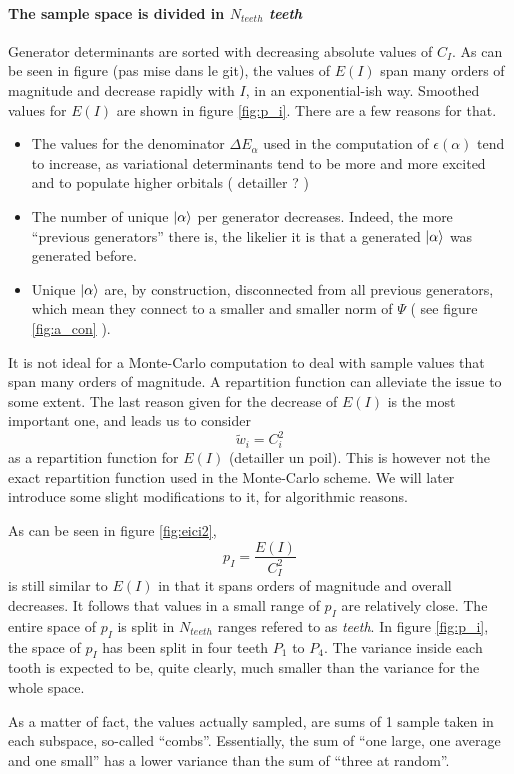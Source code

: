 \documentclass[./thesis.tex]{subfiles}
\begin{document}
\paragraph{The sample space is divided in $N_{teeth}$ \emph{teeth}}
	Generator determinants are sorted with decreasing absolute values of $C_I$.
	As can be seen in figure (pas mise dans le git), the values of $E(I)$ span many orders of magnitude and decrease rapidly with $I$, in an exponential-ish way. Smoothed values for $E(I)$ are shown in figure \ref{fig:p_i}. There are a few reasons for that.
\begin{itemize}
	\item
	The values for the denominator $\Delta E_\alpha$ used in the computation of $\epsilon(\alpha)$ tend to increase, as variational determinants tend to be more and more excited and to populate higher orbitals ( detailler ? )
	\item
	The number of unique $\ket \alpha$ per generator decreases. Indeed, the more ``previous generators'' there is, the likelier it is that a generated $\ket \alpha$ was generated before.
	\item
	Unique $\ket \alpha$ are, by construction, disconnected from all previous generators, which mean they connect to a smaller and smaller norm of $\Psi$ ( see figure \ref{fig:a_con} ). 
\end{itemize}
It is not ideal for a Monte-Carlo computation to deal with sample values that span many orders of magnitude. A repartition function can alleviate the issue to some extent.
The last reason given for the decrease of $E(I)$ is the most important one, and leads us to consider
$$\tilde w_i = C_i^2$$
as a repartition function for $E(I)$ (detailler un poil). This is however not the exact repartition function used in the Monte-Carlo scheme. We will later introduce some slight modifications to it, for algorithmic reasons.

As can be seen in figure \ref{fig:eici2}, $$p_I = \frac{E(I)}{C_I^2}$$ is  still similar to $E(I)$ in that it spans orders of magnitude and overall decreases.
It follows that values in a small range of $p_I$ are relatively close. The entire space of $p_I$ is split in $N_{teeth}$ ranges refered to as \emph{teeth}. In figure \ref{fig:p_i}, the space of $p_I$ has been split in four teeth $P_1$ to $P_4$. The variance inside each tooth is expected to be, quite clearly, much smaller than the variance for the whole space.

As a matter of fact, the values actually sampled, are sums of 1 sample taken in each subspace, so-called ``combs''.
Essentially, the sum of ``one large, one average and one small'' has a lower variance than the sum of ``three at random''.
\end{document}
